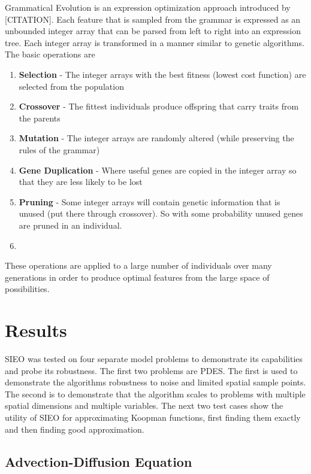\documentclass{article}
\begin{document}
Grammatical Evolution is an expression optimization approach introduced by [CITATION]. Each feature that is sampled from the grammar is expressed as an unbounded integer array that can be parsed from left to right into an expression tree. Each integer array is transformed in a manner similar to genetic algorithms. The basic operations are
\begin{enumerate}
\item \textbf{Selection} - The integer arrays with the best fitness (lowest cost function) are selected from the population
\item \textbf{Crossover} - The fittest individuals produce offspring that carry traits from the parents
\item \textbf{Mutation} - The integer arrays are randomly altered (while preserving the rules of the grammar)
\item \textbf{Gene Duplication} - Where useful genes are copied in the integer array so that they are less likely to be lost
\item \textbf{Pruning} - Some integer arrays will contain genetic information that is unused (put there through crossover). So with some probability unused genes are pruned in an individual.
\item
\end{enumerate}

These operations are applied to a large number of individuals over many generations in order to produce optimal features from the large space of possibilities.


\section{Results}
\label{results}
SIEO was tested on four separate model problems to demonstrate its capabilities and probe its robustness. The first two problems are PDES. The first is used to demonstrate the algorithms robustness to noise and limited spatial sample points. The second is to demonstrate that the algorithm scales to problems with multiple spatial dimensions and multiple variables. The next two test cases show the utility of SIEO for approximating Koopman functions, first finding them exactly and then finding good approximation.

\subsection{Advection-Diffusion Equation}
\end{document}
